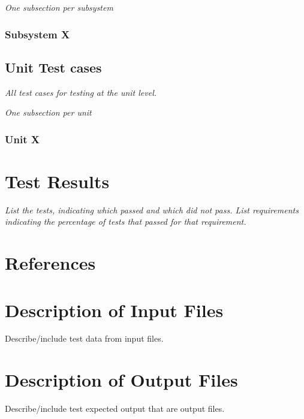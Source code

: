 \documentclass[12pt]{article}
\begin{document}
{\it
One subsection per subsystem
}

\subsubsection{Subsystem X}

\subsection{Unit Test cases}

{\it
All test cases for testing at the unit level.
}

{\it
One subsection per unit
}

\subsubsection{Unit X}

\section{Test Results}

{\it
List the tests, indicating which passed and which did not pass.
List requirements indicating the percentage of tests that passed for that requirement.
}

\section{References}

\appendix

\section{Description of Input Files}

Describe/include test data from input files.

\section{Description of Output Files}

Describe/include test expected output that are output files.
\end{document}
